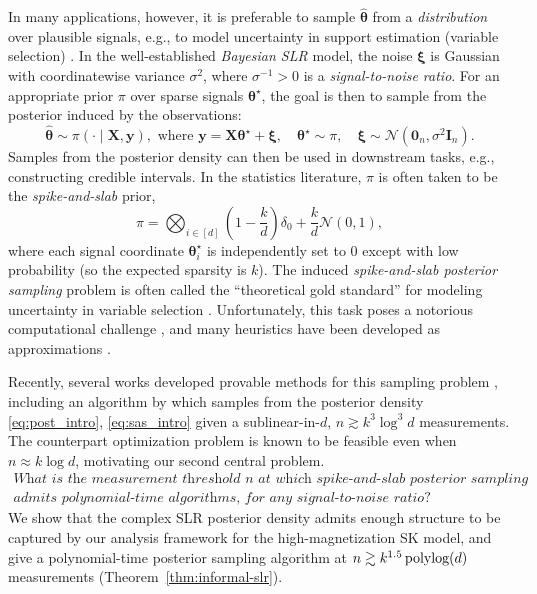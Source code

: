 \documentclass[11pt]{article}
\newcommand{\1}{\mathbf{1}}
\newcommand{\0}{\mathbf{0}}
\newcommand{\Nor}{\mathcal{N}}
\newcommand{\id}{\mathbf{I}}
\newcommand{\Par}[1]{\left(#1\right)}
\newcommand{\vth}{\boldsymbol{\theta}}
\newcommand{\vxi}{\boldsymbol{\xi}}
\newcommand{\sig}{\sigma}
\newcommand{\vths}{\vth^\star}
\newcommand{\vhth}{\widehat{\vth}}
\newcommand{\mx}{{\mathbf{X}}}
\newcommand{\vy}{{\mathbf{y}}}
\begin{document}
In many applications, however, it is preferable to sample $\vhth$ from a \emph{distribution} over plausible signals, e.g., to model uncertainty in support estimation (variable selection) \cite{MitchellB88, GeorgeM93}. In the well-established \emph{Bayesian SLR} model, the noise $\vxi$ is Gaussian with coordinatewise variance $\sig^2$, where $\sig^{-1} > 0$ is a \emph{signal-to-noise ratio}. For an appropriate prior $\pi$ over sparse signals $\vths$, the goal is then to sample from the posterior induced by the observations:
\begin{equation}\label{eq:post_intro}\vhth \sim \pi\Par{\cdot \mid \mx, \vy}, \text{ where } \vy = \mx \vths + \vxi,\quad \vths \sim \pi,\quad \vxi \sim \Nor\Par{\0_n, \sig^2 \id_n}.\end{equation}
Samples from the posterior density can then be used in downstream tasks, e.g., constructing credible intervals.
In the statistics literature, $\pi$ is often taken to be the \emph{spike-and-slab} prior, 
\begin{equation}\label{eq:sas_intro}
\pi = \bigotimes_{i \in [d]} \Par{1 - \frac k d} \delta_0 + \frac k d \Nor(0, 1),
\end{equation}
where each signal coordinate $\vths_i$ is independently set to $0$ except with low probability (so the expected sparsity is $k$). The induced \emph{spike-and-slab posterior sampling} problem is often called the ``theoretical gold standard'' for modeling uncertainty in variable selection \cite{JohnstoneS04, CarvalhoPS09, IshwaranS11, castillo2012needles, Roc18, PolsonS19}. Unfortunately, this task poses a notorious computational challenge \cite{CSHVdV15}, and many heuristics have been developed as approximations \cite{BaiRG21}. 

Recently, several works developed provable methods for this sampling problem \cite{YangWJ16, MontanariW26}, including an algorithm by \cite{KumarSTZ25} which samples from the posterior density \eqref{eq:post_intro}, \eqref{eq:sas_intro} given a sublinear-in-$d$, $n \gtrsim k^3 \log^3 d$ measurements. The counterpart optimization problem is known to be feasible even when $n \approx k\log d$, motivating our second central problem.
\begin{gather*}
\textit{What is the measurement threshold $n$ at which spike-and-slab posterior sampling} \\
\textit{admits polynomial-time algorithms, for any signal-to-noise ratio?}
\end{gather*}
We show that the complex SLR posterior density admits enough structure to be captured by our analysis framework for the high-magnetization SK model, and give a polynomial-time posterior sampling algorithm at $n\gtrsim  k^{1.5}\,\textup{polylog}(d)$ measurements (Theorem~\ref{thm:informal-slr}).
\end{document}
